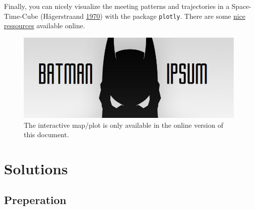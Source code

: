 \documentclass[]{book}
\begin{document}
Finally, you can nicely visualize the meeting patterns and trajectories
in a Space-Time-Cube (Hägerstraand
\protect\hyperlink{ref-hagerstraand1970}{1970}) with the package
\texttt{plotly}. There are some
\href{https://plot.ly/r/3d-line-plots/}{nice ressources} available
online.

\begin{figure}
\centering
\includegraphics{02_Images/batman-ipsum.png}
\caption{The interactive map/plot is only available in the online
version of this document.}
\end{figure}

\section{Solutions}\label{solutions-3}

\subsection{Preperation}\label{preperation-7}
\end{document}
